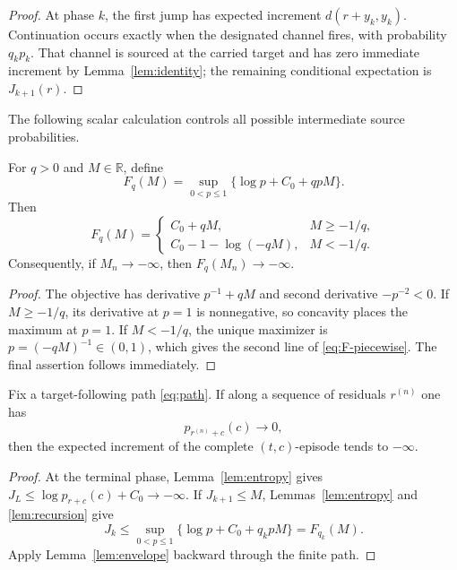 \begin{proof}
At phase \(k\), the first jump has expected increment
\(d(r+y_k,y_k)\).  Continuation occurs exactly when the designated channel
fires, with probability \(q_kp_k\).  That channel is sourced at the carried
target and has zero immediate increment by Lemma~\ref{lem:identity}; the
remaining conditional expectation is \(J_{k+1}(r)\).
\end{proof}

The following scalar calculation controls all possible intermediate source
probabilities.

\begin{lemma}\label{lem:envelope}
For \(q>0\) and \(M\in\mathbb R\), define
\[
  F_q(M)=\sup_{0<p\le1}\{\log p+C_0+qpM\}.
\]
Then
\begin{equation}\label{eq:F-piecewise}
  F_q(M)=
  \begin{cases}
    C_0+qM,&M\ge-1/q,\\
    C_0-1-\log(-qM),&M<-1/q.
  \end{cases}
\end{equation}
Consequently, if \(M_n\to-\infty\), then \(F_q(M_n)\to-\infty\).
\end{lemma}

\begin{proof}
The objective has derivative \(p^{-1}+qM\) and second derivative
\(-p^{-2}<0\).  If \(M\ge-1/q\), its derivative at \(p=1\) is nonnegative,
so concavity places the maximum at \(p=1\).  If \(M<-1/q\), the unique
maximizer is \(p=(-qM)^{-1}\in(0,1)\), which gives the second line of
\eqref{eq:F-piecewise}.  The final assertion follows immediately.
\end{proof}

\begin{proposition}\label{prop:propagation}
Fix a target-following path \eqref{eq:path}.  If along a sequence of residuals
\(r^{(n)}\) one has
\[
  p_{r^{(n)}+c}(c)\longrightarrow0,
\]
then the expected increment of the complete \((t,c)\)-episode tends to
\(-\infty\).
\end{proposition}

\begin{proof}
At the terminal phase, Lemma~\ref{lem:entropy} gives
\(J_L\le\log p_{r+c}(c)+C_0\to-\infty\).  If \(J_{k+1}\le M\),
Lemmas~\ref{lem:entropy} and \ref{lem:recursion} give
\[
  J_k\le\sup_{0<p\le1}\{\log p+C_0+q_kpM\}=F_{q_k}(M).
\]
Apply Lemma~\ref{lem:envelope} backward through the finite path.
\end{proof}

